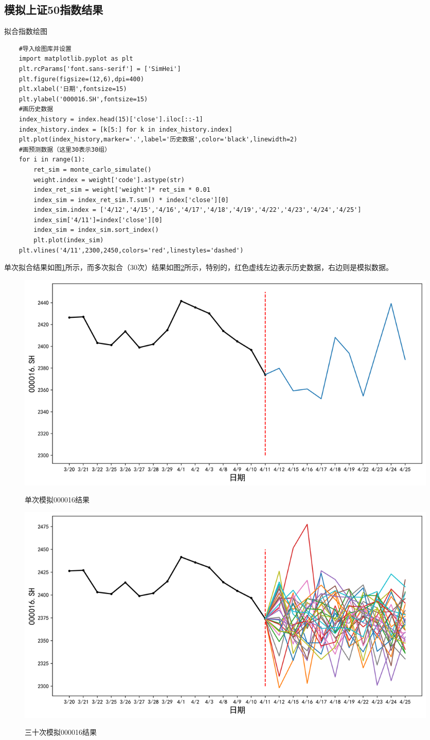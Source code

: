 \documentclass{article}
\begin{document}
    \subsection{模拟上证50指数结果}
    \begin{listing}[htb]
        \caption{拟合指数绘图}
        \begin{verbatim}
    #导入绘图库并设置
    import matplotlib.pyplot as plt
    plt.rcParams['font.sans-serif'] = ['SimHei']
    plt.figure(figsize=(12,6),dpi=400)
    plt.xlabel('日期',fontsize=15)
    plt.ylabel('000016.SH',fontsize=15)
    #画历史数据
    index_history = index.head(15)['close'].iloc[::-1]
    index_history.index = [k[5:] for k in index_history.index]  
    plt.plot(index_history,marker='.',label='历史数据',color='black',linewidth=2)
    #画预测数据（这里30表示30组）
    for i in range(1):
        ret_sim = monte_carlo_simulate()
        weight.index = weight['code'].astype(str)
        index_ret_sim = weight['weight']* ret_sim * 0.01
        index_sim = index_ret_sim.T.sum() * index['close'][0]
        index_sim.index = ['4/12','4/15','4/16','4/17','4/18','4/19','4/22','4/23','4/24','4/25']
        index_sim['4/11']=index['close'][0]
        index_sim = index_sim.sort_index()
        plt.plot(index_sim)
    plt.vlines('4/11',2300,2450,colors='red',linestyles='dashed')
    \end{verbatim}
    \end{listing}
    \qquad 单次拟合结果如图\ref{sim1}所示，而多次拟合（30次）结果如图\ref{sim2}所示，特别的，红色虚线左边表示历史数据，右边则是模拟数据。
    \begin{figure}[htbp]
        \centering
        \caption{单次模拟000016结果}
        \includegraphics[width=\textwidth]{figure/sim1.png}
        \label{sim1}
    \end{figure}
    \begin{figure}[htbp]
        \centering
        \caption{三十次模拟000016结果}
        \includegraphics[width=\textwidth]{figure/sim2.png}
        \label{sim2}
    \end{figure}
\end{document}
